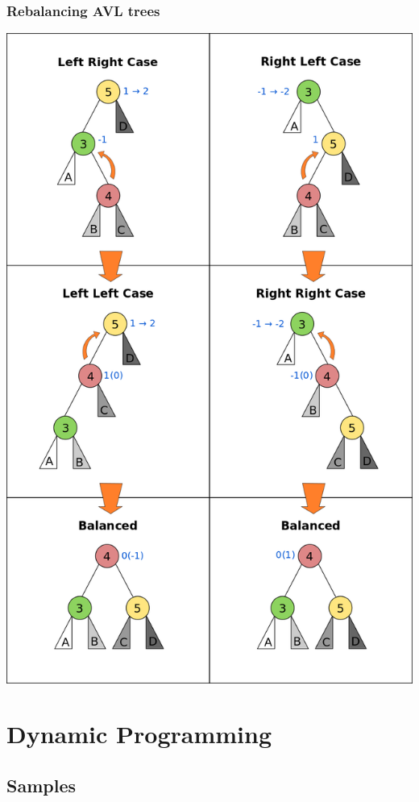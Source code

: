 \documentclass[10pt,landscape,a4paper, table]{extarticle}
\begin{document}
\begin{multicols*}{3}
\subsubsection{Rebalancing AVL trees}
{
\hspace{1cm}\includegraphics[angle=90,width = 1\linewidth]{img/AVL_Tree_Rebalancing.png}
}

\section{Dynamic Programming}

\subsection{Samples}


\end{multicols*}
\end{document}
